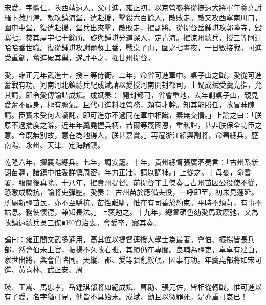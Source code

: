 \begin{pinyinscope}
宋愛，字體仁，陜西靖遠人。父可進，雍正初，以京營參將從撫遠大將軍年羹堯討羅卜藏丹津。敵攻鎮海堡，遣赴援，擊殺六百餘人，敵敗走。敵又攻西寧南川口，圍申中堡，復遣赴援，堡兵出夾擊，敵敗走，擢副將。從提督岳鍾琪攻郭隆寺，毀寨七，焚其屋宇七十餘所。旋與鍾琪分道深入，定青海。擢涼州總兵，授三等阿達哈哈番世職。復從鍾琪攻謝爾蘇土番，戰桌子山，圍之七晝夜，一日數接戰。可進受重創，奮進破其巢，遂討平之，擢甘州提督。

愛，雍正元年武進士，授三等侍衛。二年，命省可進軍中。桌子山之戰，愛從可進奮戰有功。河南河北鎮總兵紀成斌請以愛授河南開封都司，上疑成斌受羹堯指，允其請，即令愛傳諭詰成斌。成斌奏：「開封都司，省會重地，去年剿桌子山，親見愛奮不顧身，極有膽氣。且代可進料理營務，頗有才幹。知其能勝任，故冒昧陳請。臣實未受何人囑託，即可進亦不過同在軍中相識，素無交情。」上諭之曰：「朕原不過揣度之辭。近年年羹堯握兵柄，若爾等蔑國恩，重私誼，甚非朕保全功臣之意。今既無別故，意在為地得人，朕甚嘉賞。」再遷浙江紹興副將，命署總兵，歷南陽、永州、天津、定海諸鎮。

乾隆六年，擢襄陽總兵。七年，調安籠。十年，貴州總督張廣泗奏言：「古州系新闢苗疆，諸鎮中惟愛詳慎周密，年力正壯，請以調補。」上從之。丁母憂，命暫署，服闋後真除。十八年，擢貴州提督。前提督丁士傑奏言古州苗因公役使不從，恐激成驕抗，諭將吏彈壓。愛奏：「古州苗於應備夫役，一呼即至，初未見遲延。所屬新疆苗民，亦不至驕抗。苗性難馴，惟在有司善於約束。平時不煩苛，有事不姑息。務使懷德，兼知畏法。」上褒勉之。十九年，總督碩色劾愛馬政廢弛，又為故鎮遠總兵吳三傑■H0資治喪。會愛卒，寢其奏。

論曰：雍正間文武多通用，高其位以提督逕授大學士為最著。會伯、振揚皆長兵部，然會伯未上官，振揚不久改右班，其績仍在專閫。良輔為疆吏，卓卓有建白，家世出將，與會伯略同。天縱、郡、愛等弭亂綏氓，因事有功。年羹堯部將如宋可進、黃喜林、武正安、周

瑛、王嵩、馬忠孝，岳鍾琪部將如紀成斌、曹勷、張元佐，皆相從轉戰，惟可進以有子愛，名字猶可見，他皆不具始末。成斌、勷且以微罪死，是亦重可哀已！


\end{pinyinscope}